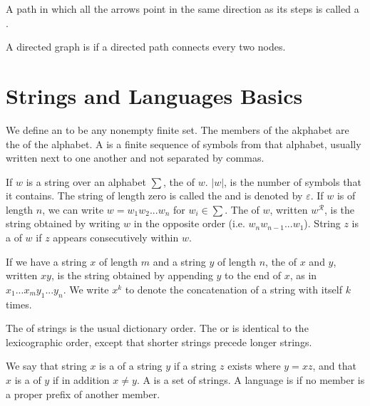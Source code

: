 \documentclass[12pt, a4paper, oneside, openright, titlepage]{book}
\begin{document}
\begin{appendices}
        \begin{defn}
            A path in which all the arrows point in the same direction as its steps is called a . 
        \end{defn}


        \begin{defn}
            A directed graph is  if a directed path connects every two nodes.
        \end{defn}

        

        \section{Strings and Languages Basics}

        We define an  to be any nonempty finite set. The members of the akphabet are the  of the alphabet. A  is a finite sequence of symbols from that alphabet, usually written next to one another and not separated by commas. 

        If $w$ is a string over an alphabet $\sum$, the  of $w$. $|w|$, is the number of symbols that it contains. The string of length zero is called the  and is denoted by $\varepsilon$. If $w$ is of length $n$, we can write $w = w_1w_2...w_n$ for $w_i \in \sum$. The  of $w$, written $w^{\mathcal{R}}$, is the string obtained by writing $w$ in the opposite order (i.e. $w_nw_{n-1}...w_1$). String $z$ is a  of $w$ if $z$ appears consecutively within $w$.

        If we have a string $x$ of length $m$ and a string $y$ of length $n$, the  of $x$ and $y$, written $xy$, is the string obtained by appending $y$ to the end of $x$, as in $x_1...x_my_1...y_n$. We write $x^k$ to denote the concatenation of a string with itself $k$ times.


        The  of strings is the usual dictionary order. The  or  is identical to the lexicographic order, except that shorter strings precede longer strings.

        We say that string $x$ is a  of a string $y$ if a string $z$ exists where $y = xz$, and that $x$ is a  of $y$ if in addition $x \neq y$. A  is a set of strings. A language is  if no member is a proper prefix of another member.




\end{appendices}
\end{document}
